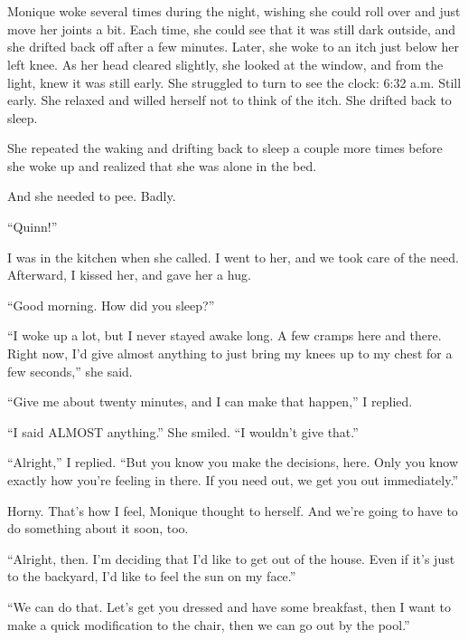 \chapter{~}
\begin{thought}
Monique woke several times during the night, wishing she could roll over and just move her
joints a bit. Each time, she could see that it was still dark outside, and she drifted back off
after a few minutes. Later, she woke to an itch just below her left knee. As her head cleared
slightly, she looked at the window, and from the light, knew it was still early. She struggled
to turn to see the clock: 6:32 a.m. Still early. She relaxed and willed herself not to think of
the itch. She drifted back to sleep.

She repeated the waking and drifting back to sleep a couple more times before she woke up
and realized that she was alone in the bed.

And she needed to pee. Badly.
\end{thought}

``Quinn!''

I was in the kitchen when she called. I went to her, and we took care of the need.
Afterward, I kissed her, and gave her a hug.

``Good morning. How did you sleep?''

``I woke up a lot, but I never stayed awake long. A few cramps here and there. Right now,
I'd give almost anything to just bring my knees up to my chest for a few seconds,'' she said.

``Give me about twenty minutes, and I can make that happen,'' I replied.

``I said ALMOST anything.'' She smiled. ``I wouldn't give that.''

``Alright,'' I replied. ``But you know you make the decisions, here. Only you know exactly how
you're feeling in there. If you need out, we get you out immediately.''

\begin{thought}
Horny. That's how I feel, Monique thought to herself. And we're going to have to do
something about it soon, too.
\end{thought}

``Alright, then. I'm deciding that I'd like to get out of the house. Even if it's just to the
backyard, I'd like to feel the sun on my face.''

``We can do that. Let's get you dressed and have some breakfast, then I want to make a quick
modification to the chair, then we can go out by the pool.''

